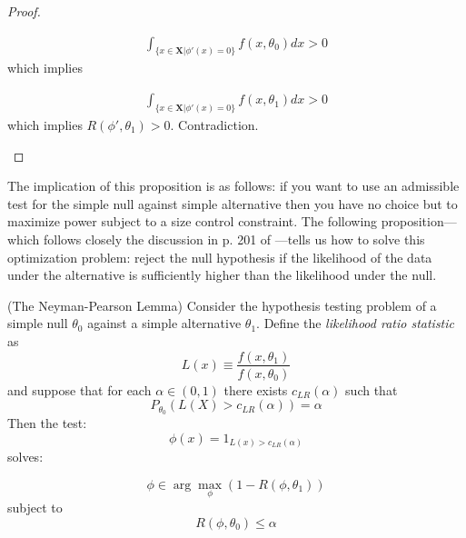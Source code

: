 \documentclass[11pt]{article} %
\begin{document}
\begin{proof}
\begin{enumerate}
\begin{align*}
\int_{\{x \in \textbf{X} | \phi'(x)=0 \}} f(x,\theta_0) dx > 0
\end{align*}
which implies

\begin{align*}
\int_{\{x \in \textbf{X} | \phi'(x)=0 \}} f(x,\theta_1) dx > 0
\end{align*}
which implies $R(\phi',\theta_1)>0$. Contradiction.

\end{enumerate}

\end{proof}


The implication of this proposition is as follows: if you want to use an admissible test for the simple null against simple alternative then you have no choice but to maximize power subject to a size control constraint. The following proposition---which follows closely the discussion in p. 201 of \cite{Ferguson67}---tells us how to solve this optimization problem: reject the null hypothesis if the likelihood of the data under the alternative is sufficiently higher than the likelihood under the null. 



\begin{proposition} (The Neyman-Pearson Lemma) Consider the  hypothesis testing problem of a simple null $\theta_0$ against a simple alternative $\theta_1$. Define the \emph{likelihood ratio statistic} as
\begin{equation*}
L(x) \equiv \frac{f(x, \theta_1)}{f(x, \theta_0)}
\end{equation*}
and suppose that for each $\alpha \in (0,1)$ there exists $c_{LR}(\alpha)$ such that
\begin{equation*}
P_{\theta_0} (L(X)>c_{LR}(\alpha))=\alpha
\end{equation*}
Then the test:
\begin{equation} \label{equation:NPtest}
\phi(x)= 1_{L(x)>c_{LR}(\alpha)}
\end{equation}
solves:

\begin{equation*}
\phi \in \arg \max_{\phi} (1-R(\phi, \theta_1) )
\end{equation*}
\noindent subject to 
$$R(\phi,\theta_0) \leq \alpha $$

\end{proposition}
\end{document}
